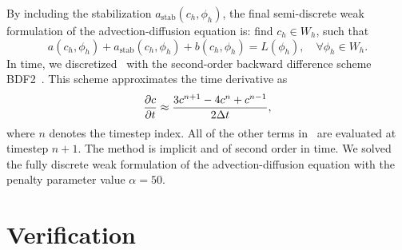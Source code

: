 \documentclass{WileyMSP-template}
\begin{document}
By including the stabilization $a_{\mathrm{stab}}(c_h, \phi_h)$,
the final semi-discrete weak formulation of the advection-diffusion equation is:
find $c_h\in W_h$, such that
\begin{equation}
    a(c_h, \phi_h) + a_{\mathrm{stab}}(c_h, \phi_h) + b(c_h, \phi_h) = L(\phi_h),
    \quad\forall\phi_h\in W_h.
    \label{eq:discrete_weak_form_adv_diff}
\end{equation}
In time, we discretized~ with the
second-order backward difference scheme BDF2~\cite{Volker2016}. This scheme
approximates the time derivative as
\begin{equation*}
    \frac{\partial c}{\partial t} \approx \frac{3c^{n+1} - 4c^n + c^{n-1}}{2\Delta t},
\end{equation*}
where $n$ denotes the timestep index. All of the other terms
in~ are evaluated at timestep $n+1$.
The method is implicit and of second order in time. We solved the fully
discrete weak formulation of the advection-diffusion equation
with the penalty parameter value $\alpha=50$.

\section{Verification}\label{sec:appB_verification}
\end{document}
